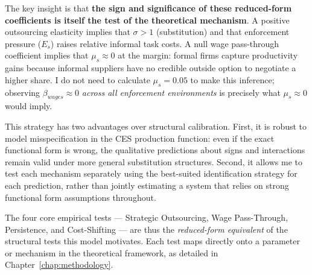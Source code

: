 The key insight is that \textbf{the sign and significance of these reduced-form coefficients is itself the test of the theoretical mechanism}. A positive outsourcing elasticity implies that $\sigma > 1$ (substitution) and that enforcement pressure ($E_s$) raises relative informal task costs. A null wage pass-through coefficient implies that $\mu_s \approx 0$ at the margin: formal firms capture productivity gains because informal suppliers have no credible outside option to negotiate a higher share. I do not need to calculate $\mu_s = 0.05$ to make this inference; observing $\beta_{wages} \approx 0$ \textit{across all enforcement environments} is precisely what $\mu_s \approx 0$ would imply.

This strategy has two advantages over structural calibration. First, it is robust to model misspecification in the CES production function: even if the exact functional form is wrong, the qualitative predictions about signs and interactions remain valid under more general substitution structures. Second, it allows me to test each mechanism separately using the best-suited identification strategy for each prediction, rather than jointly estimating a system that relies on strong functional form assumptions throughout.

The four core empirical tests --- Strategic Outsourcing, Wage Pass-Through, Persistence, and Cost-Shifting --- are thus the \textit{reduced-form equivalent} of the structural tests this model motivates. Each test maps directly onto a parameter or mechanism in the theoretical framework, as detailed in Chapter~\ref{chap:methodology}.
